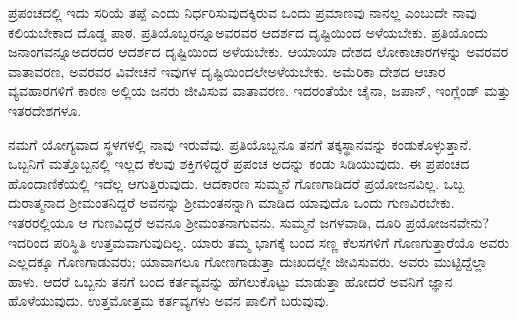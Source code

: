 ಪ್ರಪಂಚದಲ್ಲಿ ಇದು ಸರಿಯೆ ತಪ್ಪೆ ಎಂದು ನಿರ್ಧರಿಸುವುದಕ್ಕಿರುವ ಒಂದು ಪ್ರಮಾ\-ಣವು ನಾನಲ್ಲ ಎಂಬುದೇ ನಾವು ಕಲಿಯಬೇಕಾದ ದೊಡ್ಡ ಪಾಠ. ಪ್ರತಿಯೊಬ್ಬರನ್ನೂ\break ಅವರವರ ಆದರ್ಶದ ದೃಷ್ಟಿಯಿಂದ ಅಳೆಯಬೇಕು. ಪ್ರತಿಯೊಂದು ಜನಾಂಗವನ್ನೂ\break ಅದರದರ ಆದರ್ಶದ ದೃಷ್ಟಿಯಿಂದ ಅಳೆಯಬೇಕು. ಆಯಾಯಾ ದೇಶದ ಲೋಕಾಚಾರಗಳನ್ನು ಅವರವರ ವಾತಾವರಣ, ಅವರವರ ವಿವೇಚನೆ ಇವುಗಳ ದೃಷ್ಟಿಯಿಂದಲೇ\break ಅಳೆಯಬೇಕು. ಅಮೆರಿಕಾ ದೇಶದ ಆಚಾರ ವ್ಯವಹಾರಗಳಿಗೆ ಕಾರಣ ಅಲ್ಲಿಯ ಜನರು ಜೀವಿಸುವ ವಾತಾವರಣ. ಇದರಂತೆಯೇ ಚೈನಾ, ಜಪಾನ್​, ಇಂಗ್ಲೆಂಡ್​ ಮತ್ತು ಇತರ\break ದೇಶಗಳೂ.

ನಮಗೆ ಯೋಗ್ಯವಾದ ಸ್ಥಳಗಳಲ್ಲಿ ನಾವು ಇರುವೆವು. ಪ್ರತಿಯೊಬ್ಬನೂ ತನಗೆ ತಕ್ಕ\break ಸ್ಥಾನವನ್ನು ಕಂಡುಕೊಳ್ಳುತ್ತಾನೆ. ಒಬ್ಬನಿಗೆ ಮತ್ತೊಬ್ಬನಲ್ಲಿ ಇಲ್ಲದ ಕೆಲವು ಶಕ್ತಿಗಳಿದ್ದರೆ ಪ್ರಪಂಚ ಅದನ್ನು ಕಂಡು ಸಿಡಿಯುವುದು. ಈ ಪ್ರಪಂಚದ ಹೊಂದಾಣಿಕೆಯಲ್ಲಿ ಇದೆಲ್ಲ ಆಗುತ್ತಿರುವುದು. ಆದಕಾರಣ ಸುಮ್ಮನೆ ಗೊಣಗಾಡಿದರೆ ಪ್ರಯೋಜನವಿಲ್ಲ. ಒಬ್ಬ ದುರಾತ್ಮನಾದ ಶ‍್ರೀಮಂತನಿದ್ದರೆ ಅವನನ್ನು ಶ‍್ರೀಮಂತನನ್ನಾಗಿ ಮಾಡಿದ ಯಾವುದೊ ಒಂದು ಗುಣವಿರಬೇಕು. ಇತರರಲ್ಲಿಯೂ ಆ ಗುಣವಿದ್ದರೆ ಅವನೂ ಶ‍್ರೀಮಂತನಾಗುವನು. ಸುಮ್ಮನೆ ಜಗಳವಾಡಿ, ದೂರಿ ಪ್ರಯೋಜನವೇನು? ಇದರಿಂದ ಪರಿಸ್ಥಿತಿ ಉತ್ತಮವಾಗುವುದಿಲ್ಲ. ಯಾರು ತಮ್ಮ ಭಾಗಕ್ಕೆ ಬಂದ ಸಣ್ಣ ಕೆಲಸಗಳಿಗೆ ಗೊಣಗುತ್ತಾರೆಯೊ ಅವರು ಎಲ್ಲದಕ್ಕೂ ಗೊಣಗಾಡುವರು; ಯಾವಾಗಲೂ ಗೋಣಗಾಡುತ್ತಾ ದುಃಖದಲ್ಲೇ ಜೀವಿಸುವರು. ಅವರು ಮುಟ್ಟಿದ್ದೆಲ್ಲಾ ಹಾಳು. ಆದರೆ ಒಬ್ಬನು ತನಗೆ ಬಂದ ಕರ್ತವ್ಯವನ್ನು ಹೆಗಲುಕೊಟ್ಟು ಮಾಡುತ್ತಾ ಹೋದರೆ ಅವನಿಗೆ ಜ್ಞಾನ ಹೊಳೆಯುವುದು. ಉತ್ತಮೋತ್ತಮ ಕರ್ತವ್ಯಗಳು ಅವನ ಪಾಲಿಗೆ ಬರುವುವು.

